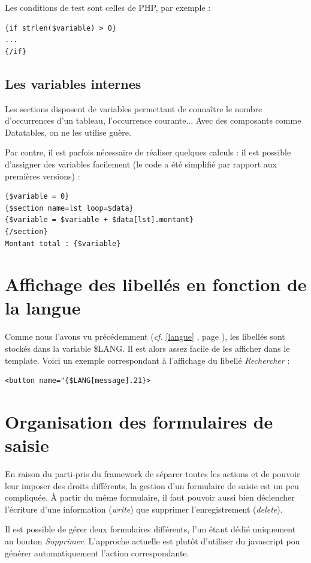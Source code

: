 Les conditions de test sont celles de PHP, par exemple :
\begin{lstlisting}
{if strlen($variable) > 0}
...
{/if}
\end{lstlisting}

\subsection{Les variables internes}
Les sections disposent de variables permettant de connaître le nombre d'occurrences d'un tableau, l'occurrence courante... Avec des composants comme Datatables, on ne les utilise guère.

Par contre, il est parfois nécessaire de réaliser quelques calculs : il est possible d'assigner des variables facilement (le code a été simplifié par rapport aux premières versions) :

\begin{lstlisting}
{$variable = 0}
{$section name=lst loop=$data}
{$variable = $variable + $data[lst].montant}
{/section}
Montant total : {$variable}
\end{lstlisting}

\section{Affichage des libellés en fonction de la langue}

Comme nous l'avons vu précédemment (\textit{cf.} \ref{langue} \textit{}, page \pageref{langue}), les libellés sont stockés dans la variable \$LANG. Il est alors assez facile de les afficher dans le template. Voici un exemple correspondant à l'affichage du libellé \textit{Rechercher} :
\begin{lstlisting}
<button name="{$LANG[message].21}>
\end{lstlisting}


\section{Organisation des formulaires de saisie}

En raison du parti-pris du framework de séparer toutes les actions et de pouvoir leur imposer des droits différents, la gestion d'un formulaire de saisie est un peu compliquée. À partir du même formulaire, il faut pouvoir aussi bien déclencher l'écriture d'une information (\textit{write}) que supprimer l'enregistrement (\textit{delete}). 

Il est possible de gérer deux formulaires différents, l'un étant dédié uniquement au bouton \textit{Supprimer}. L'approche actuelle est plutôt d'utiliser du javascript pou générer automatiquement l'action correspondante.

